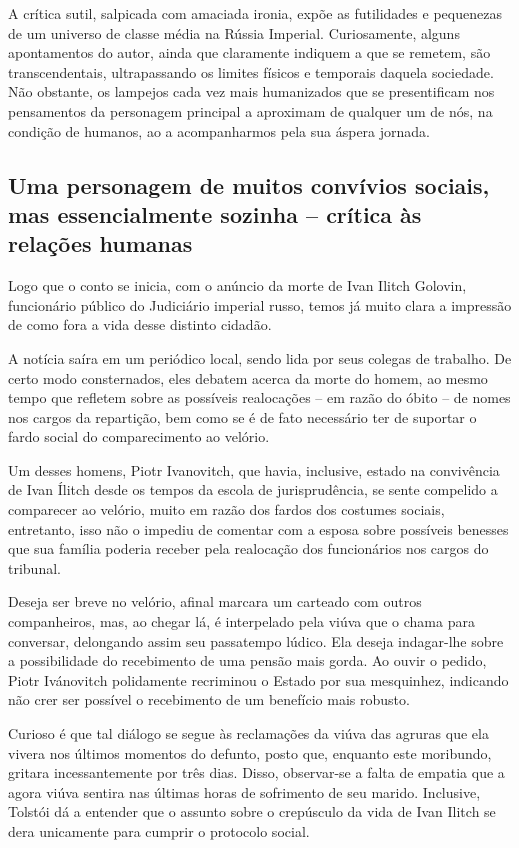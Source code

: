 \documentclass[12pt]{extarticle}
\begin{document}


A crítica sutil, salpicada com amaciada ironia, expõe as futilidades e
pequenezas de um universo de classe média na Rússia Imperial.
Curiosamente, alguns apontamentos do autor, ainda que claramente
indiquem a que se remetem, são transcendentais, ultrapassando os limites
físicos e temporais daquela sociedade. Não obstante, os lampejos cada
vez mais humanizados que se presentificam nos pensamentos da personagem
principal a aproximam de qualquer um de nós, na condição de humanos, ao
a acompanharmos pela sua áspera jornada.

\subsection{Uma personagem de muitos convívios sociais, mas essencialmente
sozinha -- crítica às relações humanas}

Logo que o conto se inicia, com o anúncio da morte de Ivan Ilitch
Golovin, funcionário público do Judiciário imperial russo, temos já
muito clara a impressão de como fora a vida desse distinto cidadão.

A notícia saíra em um periódico local, sendo lida por seus colegas de
trabalho. De certo modo consternados, eles debatem acerca da morte do
homem, ao mesmo tempo que refletem sobre as possíveis realocações -- em
razão do óbito -- de nomes nos cargos da repartição, bem como se é de
fato necessário ter de suportar o fardo social do comparecimento ao
velório.

Um desses homens, Piotr Ivanovitch, que havia, inclusive, estado na
convivência de Ivan Ílitch desde os tempos da escola de jurisprudência,
se sente compelido a comparecer ao velório, muito em razão dos fardos
dos costumes sociais, entretanto, isso não o impediu de comentar com a
esposa sobre possíveis benesses que sua família poderia receber pela
realocação dos funcionários nos cargos do tribunal.

Deseja ser breve no velório, afinal marcara um carteado com outros
companheiros, mas, ao chegar lá, é interpelado pela viúva que o chama
para conversar, delongando assim seu passatempo lúdico. Ela deseja
indagar-lhe sobre a possibilidade do recebimento de uma pensão mais
gorda. Ao ouvir o pedido, Piotr Ivánovitch polidamente recriminou o
Estado por sua mesquinhez, indicando não crer ser possível o recebimento
de um benefício mais robusto.

Curioso é que tal diálogo se segue às reclamações da viúva das agruras
que ela vivera nos últimos momentos do defunto, posto que, enquanto este
moribundo, gritara incessantemente por três dias. Disso, observar-se a
falta de empatia que a agora viúva sentira nas últimas horas de
sofrimento de seu marido. Inclusive, Tolstói dá a entender que o assunto
sobre o crepúsculo da vida de Ivan Ilitch se dera unicamente para
cumprir o protocolo social.
\end{document}
